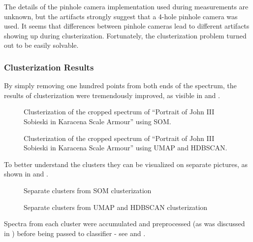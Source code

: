 The details of the pinhole camera implementation used during measurements are unknown, but the artifacts strongly suggest that a 4-hole pinhole camera was used. 
It seems that differences between pinhole cameras lead to different artifacts showing up during clusterization. 
Fortunately, the clusterization problem turned out to be easily solvable.

\newpage
\subsubsection{Clusterization Results}
By simply removing one hundred points from both ends of the spectrum, the results of clusterization were tremendously improved, as visible in  and .

\begin{figure}[H]
  \centering
  
  \caption{Clusterization of the cropped spectrum of ``Portrait of John III Sobieski in Karacena Scale Armour'' using SOM.}
  \label{fig:som-clusterization-clean}
\end{figure}

\begin{figure}[H]
  \centering
  
  \caption{Clusterization of the cropped spectrum of ``Portrait of John III Sobieski in Karacena Scale Armour'' using UMAP and HDBSCAN.}
  \label{fig:hdbscan-clusterization-clean}
\end{figure}

\newpage
To better understand the clusters they can be visualized on separate pictures, as shown in  and .
\begin{figure}[!htbp]
  \centering
  
  \caption{Separate clusters from SOM clusterization}
  \label{fig:som-clusters-clean}
\end{figure}

\begin{figure}[!htbp]
  \centering
  
  \caption{Separate clusters from UMAP and HDBSCAN clusterization}
  \label{fig:hdbscan-clusters-clean}
\end{figure}


\newpage
\label{sec:clustered-spectra}
Spectra from each cluster were accumulated and preprocessed (as was discussed in ) before being passed to classifier - see  and .

